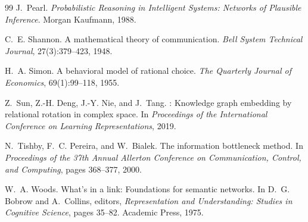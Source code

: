 \documentclass[11pt]{article}
\theoremstyle{definition}
\begin{document}
\begin{thebibliography}{99}
J.~Pearl.
\newblock \emph{Probabilistic Reasoning in Intelligent Systems: Networks of
  Plausible Inference}.
\newblock Morgan Kaufmann, 1988.

C.~E. Shannon.
\newblock A mathematical theory of communication.
\newblock \emph{Bell System Technical Journal}, 27(3):379--423, 1948.

H.~A. Simon.
\newblock A behavioral model of rational choice.
\newblock \emph{The Quarterly Journal of Economics}, 69(1):99--118, 1955.

Z.~Sun, Z.-H. Deng, J.-Y. Nie, and J.~Tang.
: Knowledge graph embedding by relational rotation in complex
  space.
\newblock In \emph{Proceedings of the International Conference on Learning
  Representations}, 2019.

N.~Tishby, F.~C. Pereira, and W.~Bialek.
\newblock The information bottleneck method.
\newblock In \emph{Proceedings of the 37th Annual Allerton Conference on
  Communication, Control, and Computing}, pages 368--377, 2000.

W.~A. Woods.
\newblock What's in a link: Foundations for semantic networks.
\newblock In D.~G. Bobrow and A.~Collins, editors, \emph{Representation and
  Understanding: Studies in Cognitive Science}, pages 35--82. Academic Press,
  1975.

\end{thebibliography}
\end{document}

